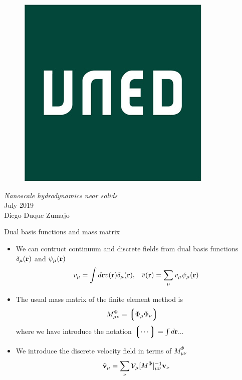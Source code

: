 \documentclass{beamer}
\newcommand{\llg}{\left\lgroup}
\newcommand{\rlg}{\right\rgroup}
\begin{document}
\begin{frame}
\begin{figure}
\includegraphics[width=0.2\linewidth]{logo}
\end{figure}
  \vspace{0.5cm}  
\begin{center}
\textit{Nanoscale hydrodynamics near solids}\\
July 2019\\
Diego Duque Zumajo
\end{center}

\end{frame}

\begin{frame}{Dual basis functions and mass matrix}
  \begin{itemize}
  \item We can contruct continuum and discrete fields from dual basis functions $\delta_{\mu}({\bf r})$ and $\psi_\mu({\bf r})$ 
    \begin{align}
      v_\mu=\int d{\bf r}v({\bf r})\delta_\mu({\bf r}),&&
        \overline{v}({\bf r}) =\sum_{\mu}v_\mu\psi_\mu({\bf r})
    \nonumber
    \end{align}
    \item The usual mass matrix of the finite element method is
      \begin{align}
      M^\Phi_{\mu\nu}&=\llg\Phi_\mu\Phi_\nu\rlg  
      \nonumber
      \end{align}
      where we have introduce the notation $\llg\cdots\rlg=\int d{\bf r}...$
    \item We introduce the discrete velocity field in terms of $M^\Phi_{\mu\nu}$
      \begin{align}
        \tilde{{\bf v}}_{\mu}=\sum_{\nu}{\cal V}_{\mu}[M^{\Phi}]^{-1}_{\mu\nu}{\bf v}_{\nu}
        \nonumber
      \end{align}
  \end{itemize}
\end{frame}
\end{document}
